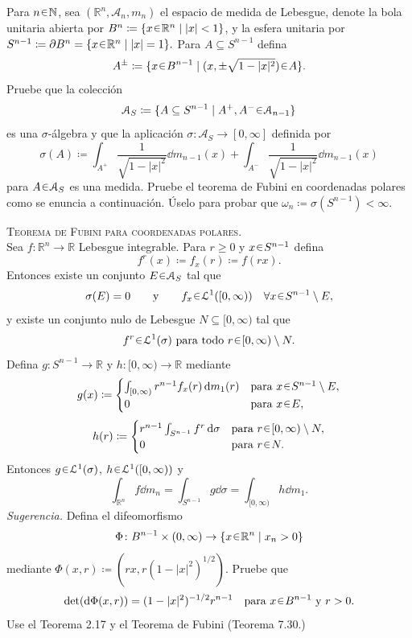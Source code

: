 \setcounter{neje}{46}
\begin{nejer} 
Para $n \en \mathbb{N}$, sea $(\mathbb{R}^n, \mathcal{A}_n, m_n)$ el espacio de medida de Lebesgue, denote la bola unitaria abierta por $B^n \coloneq \{x \en \mathbb{R}^n \mid |x| < 1\}$, y la esfera unitaria por
$
S^{n-1} \coloneq \partial B^n = \{x \en \mathbb{R}^n \mid |x| = 1\}.
$
Para $A \subseteq S^{n-1}$ defina
$$
A^\pm \coloneq \{x \en B^{n-1} \mid (x, \pm \sqrt{1 - |x|^2}) \en A\}.
$$
Pruebe que la colección
$$
\mathcal{A}_S \coloneq \{A \subseteq S^{n-1} \mid A^+, A^- \en \mathcal{A}_{n-1}\}
$$
es una $\sigma$-álgebra y que la aplicación
$
\sigma \colon \mathcal{A}_S \to [0, \infty]
$
definida por
$$
\sigma(A) \coloneq \int_{A^+} \frac{1}{\sqrt{1 - |x|^2}} \dd{m_{n-1}(x)} + \int_{A^-} \frac{1}{\sqrt{1 - |x|^2}} \dd{m_{n-1}(x)}
$$
para $A \en \mathcal{A}_S$ es una medida. Pruebe el teorema de Fubini en coordenadas polares como se enuncia a continuación. Úselo para probar que
$
\omega_n \coloneq \sigma(S^{n-1}) < \infty.
$\par\vspace{1em}
{\scshape Teorema de Fubini para coordenadas polares.}\\ Sea $f \colon \mathbb{R}^n \to \mathbb{R}$ Lebesgue integrable. Para $r \ge 0$ y $x \en S^{n-1}$ defina
$$
f^r(x) \coloneq f_x(r) \coloneq f(rx).
$$
Entonces existe un conjunto $E \en \mathcal{A}_S$ tal que
$$
\sigma(E) = 0 \qquad \text{y} \qquad f_x \en \mathcal{L}^1([0, \infty)) \quad\forall x \en S^{n-1} \setminus E,
$$
y existe un conjunto nulo de Lebesgue $N \subseteq [0, \infty)$ tal que
$$
f^r \en \mathcal{L}^1(\sigma) \text{ para todo } r \en [0, \infty) \setminus N.
$$
Defina $g \colon S^{n-1} \to \mathbb{R}$ y $h \colon [0, \infty) \to \mathbb{R}$ mediante
$$
g(x) \coloneq \begin{cases}
\int_{[0, \infty)} r^{n-1} f_x(r) \dd{m_1(r)} & \text{para } x \en S^{n-1} \setminus E, \\
0 & \text{para } x \en E,
\end{cases}
$$
$$
h(r) \coloneq \begin{cases}
r^{n-1} \int_{S^{n-1}} f^r \dd{\sigma} & \text{para } r \en [0, \infty) \setminus N, \\
0 & \text{para } r \en N.
\end{cases}
$$
Entonces $g \en \mathcal{L}^1(\sigma)$, $h \en \mathcal{L}^1([0, \infty))$ y
$$
\int_{\mathbb{R}^n} f \dd{m_n} = \int_{S^{n-1}} g \dd{\sigma} = \int_{[0, \infty)} h \dd{m_1}.
$$
\emph{Sugerencia.} Defina el difeomorfismo
$$
\Phi \colon B^{n-1} \times (0, \infty) \to \{x \en \mathbb{R}^n \mid x_n > 0\}
$$
mediante $\Phi(x, r) \coloneq (rx, r(1 - |x|^2)^{1/2})$. Pruebe que
$$
\det(\dd{\Phi(x, r)}) = (1 - |x|^2)^{-1/2} r^{n-1} \quad \text{para } x \en B^{n-1} \text{ y } r > 0.
$$
Use el Teorema 2.17 y el Teorema de Fubini (Teorema 7.30.)
\end{nejer}
